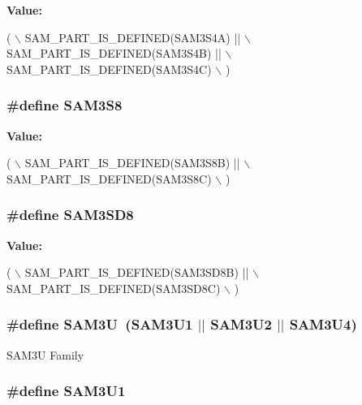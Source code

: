 {\bfseries Value\-:}
\begin{DoxyCode}
( \(\backslash\)
        SAM\_PART\_IS\_DEFINED(SAM3S4A) || \(\backslash\)
        SAM\_PART\_IS\_DEFINED(SAM3S4B) || \(\backslash\)
        SAM\_PART\_IS\_DEFINED(SAM3S4C) \(\backslash\)
        )
\end{DoxyCode}
\hypertarget{group__sam__part__macros__group_gaea8f1cca303520385d12110ad8e8bafe}{
\subsubsection[{S\-A\-M3\-S8}]{\setlength{\rightskip}{0pt plus 5cm}\#define S\-A\-M3\-S8}}\label{group__sam__part__macros__group_gaea8f1cca303520385d12110ad8e8bafe}
{\bfseries Value\-:}
\begin{DoxyCode}
( \(\backslash\)
        SAM\_PART\_IS\_DEFINED(SAM3S8B) || \(\backslash\)
        SAM\_PART\_IS\_DEFINED(SAM3S8C) \(\backslash\)
        )
\end{DoxyCode}
\hypertarget{group__sam__part__macros__group_ga9f16069247b2e38ddb0bcaa912750a4f}{
\subsubsection[{S\-A\-M3\-S\-D8}]{\setlength{\rightskip}{0pt plus 5cm}\#define S\-A\-M3\-S\-D8}}\label{group__sam__part__macros__group_ga9f16069247b2e38ddb0bcaa912750a4f}
{\bfseries Value\-:}
\begin{DoxyCode}
( \(\backslash\)
        SAM\_PART\_IS\_DEFINED(SAM3SD8B) || \(\backslash\)
        SAM\_PART\_IS\_DEFINED(SAM3SD8C) \(\backslash\)
        )
\end{DoxyCode}
\hypertarget{group__sam__part__macros__group_ga987abac1ef39b0b447b8b11419942476}{
\subsubsection[{S\-A\-M3\-U}]{\setlength{\rightskip}{0pt plus 5cm}\#define S\-A\-M3\-U~({\bf S\-A\-M3\-U1} $|$$|$ {\bf S\-A\-M3\-U2} $|$$|$ {\bf S\-A\-M3\-U4})}}\label{group__sam__part__macros__group_ga987abac1ef39b0b447b8b11419942476}
S\-A\-M3\-U Family \hypertarget{group__sam__part__macros__group_gae39c5d03b1af93b2864e5f72908a0ff3}{
\subsubsection[{S\-A\-M3\-U1}]{\setlength{\rightskip}{0pt plus 5cm}\#define S\-A\-M3\-U1}}\label{group__sam__part__macros__group_gae39c5d03b1af93b2864e5f72908a0ff3}
